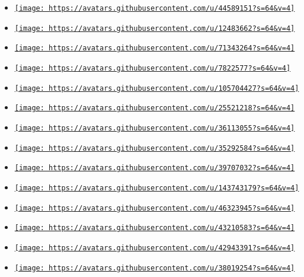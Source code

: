 \begin{itemize}
\item
  \href{https://github.com/frozolotl}{\texttt{[image: https://avatars.githubusercontent.com/u/44589151?s=64\&v=4]}}
\item
  \href{https://github.com/peng1999}{\texttt{[image: https://avatars.githubusercontent.com/u/12483662?s=64\&v=4]}}
\item
  \href{https://github.com/0scvr}{\texttt{[image: https://avatars.githubusercontent.com/u/71343264?s=64\&v=4]}}
\item
  \href{https://github.com/7sDream}{\texttt{[image: https://avatars.githubusercontent.com/u/7822577?s=64\&v=4]}}
\item
  \href{https://github.com/8LWXpg}{\texttt{[image: https://avatars.githubusercontent.com/u/105704427?s=64\&v=4]}}
\item
  \href{https://github.com/Enter-tainer}{\texttt{[image: https://avatars.githubusercontent.com/u/25521218?s=64\&v=4]}}
\item
  \href{https://github.com/FlyinPancake}{\texttt{[image: https://avatars.githubusercontent.com/u/36113055?s=64\&v=4]}}
\item
  \href{https://github.com/Myriad-Dreamin}{\texttt{[image: https://avatars.githubusercontent.com/u/35292584?s=64\&v=4]}}
\item
  \href{https://github.com/T0mstone}{\texttt{[image: https://avatars.githubusercontent.com/u/39707032?s=64\&v=4]}}
\item
  \href{https://github.com/TheJosefOlsson}{\texttt{[image: https://avatars.githubusercontent.com/u/143743179?s=64\&v=4]}}
\item
  \href{https://github.com/WannesMalfait}{\texttt{[image: https://avatars.githubusercontent.com/u/46323945?s=64\&v=4]}}
\item
  \href{https://github.com/WeetHet}{\texttt{[image: https://avatars.githubusercontent.com/u/43210583?s=64\&v=4]}}
\item
  \href{https://github.com/Weissnix4711}{\texttt{[image: https://avatars.githubusercontent.com/u/42943391?s=64\&v=4]}}
\item
  \href{https://github.com/Zheoni}{\texttt{[image: https://avatars.githubusercontent.com/u/38019254?s=64\&v=4]}}

\end{itemize}
